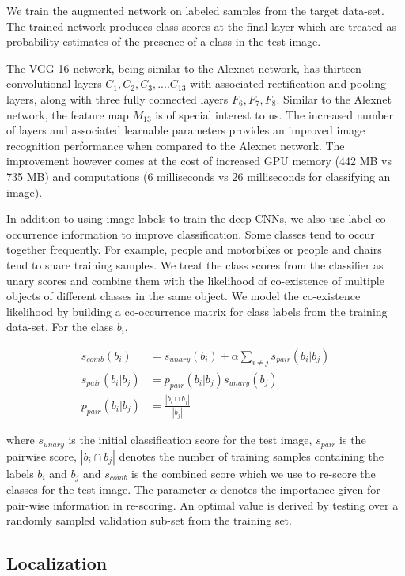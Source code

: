 \documentclass[runningheads]{llncs}
\begin{document}
We train the augmented network on labeled samples from the target data-set. The trained network produces class scores at the final layer which are treated as probability estimates of the presence of a class in the test image.


The VGG-16 network, being similar to the Alexnet network, has thirteen convolutional layers $C_1, C_2, C_3, .... C_{13}$ with associated rectification and  pooling layers, along with three fully connected layers $F_6, F_7, F_8$. Similar to the Alexnet network, the feature map $M_{13}$ is of special interest to us.
The increased number of layers and associated learnable parameters provides an improved image recognition performance when compared to the Alexnet network. The improvement however comes at the cost of increased GPU memory (442 MB vs 735 MB) and computations (6 milliseconds  vs 26 milliseconds for classifying an image).


In addition to using image-labels to train the deep CNNs, we also use label co-occurrence information to improve classification. Some classes tend to occur together frequently. For example, people and motorbikes or people and chairs tend to share training samples. We treat the class scores from the classifier as unary scores and combine them with the likelihood of co-existence of multiple objects of different classes in the same object. We model the co-existence likelihood by building a co-occurrence matrix for class labels from the training data-set.  For the class $b_i$,

\begin{align}
s_{comb}(b_i) &= s_{unary}(b_i) + \alpha \sum_{i \neq j}s_{pair}(b_i|b_j) \\ \label{eq:rescoring}
s_{pair}(b_i| b_j) &= p_{pair}(b_i|b_j)s_{unary}(b_j) \\
p_{pair}(b_i|b_j) &= \frac{|b_i \cap b_j|}{|b_j|}
\end{align}

\noindent where $s_{unary}$ is the initial classification score for the test image, $s_{pair}$ is the pairwise score, $|b_i \cap b_j|$ denotes the number of training samples containing the labels $b_i$ and $b_j$ and $s_{comb}$ is the combined score which we use to re-score the classes for the test image. The parameter $\alpha$ denotes the importance given for pair-wise information in re-scoring. An optimal value is derived by testing over a randomly sampled validation sub-set from the training set.

\subsection{Localization}
\end{document}
